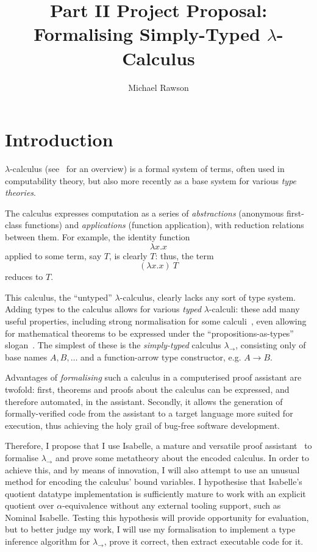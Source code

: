 \documentclass[12pt]{article}
\title{Part II Project Proposal: Formalising Simply-Typed \(\lambda\)-Calculus}
\author{Michael Rawson}
\begin{document}


\section*{Introduction}
\(\lambda\)-calculus (see~\parencite{lambda-overview} for an overview) is a formal system of terms, often used in computability theory, but also more recently as a base system for various \emph{type theories}.

The calculus expresses computation as a series of \emph{abstractions} (anonymous first-class functions) and \emph{applications} (function application), with reduction relations between them.
For example, the identity function
\[
\lambda x.x
\]
applied to some term, say \(T\), is clearly \(T\): thus, the term
\[
(\lambda x.x)\ T
\]
reduces to \(T\).

This calculus, the ``untyped'' \(\lambda\)-calculus, clearly lacks any sort of type system.
Adding types to the calculus allows for various \emph{typed} \(\lambda\)-calculi: these add many useful properties, including strong normalisation for some calculi~\parencite{strong-normalisation}, even allowing for mathematical theorems to be expressed under the ``propositions-as-types'' slogan~\parencite{curry-howard}.
The simplest of these is the \emph{simply-typed} calculus \(\lambda_\to\), consisting only of base names \(A, B, \ldots\) and a function-arrow type constructor, e.g. \(A \to B\).

Advantages of \emph{formalising} such a calculus in a computerised proof assistant are twofold: first, theorems and proofs about the calculus can be expressed, and therefore automated, in the assistant.
Secondly, it allows the generation of formally-verified code from the assistant to a target language more suited for execution, thus achieving the holy grail of bug-free software development.

Therefore, I propose that I use Isabelle, a mature and versatile proof assistant~\parencite{isabelle-overview} to formalise \(\lambda_\to\) and prove some metatheory about the encoded calculus.
In order to achieve this, and by means of innovation, I will also attempt to use an unusual method for encoding the calculus' bound variables.
I hypothesise that Isabelle's quotient datatype implementation is sufficiently mature to work with an explicit quotient over \(\alpha\)-equivalence without any external tooling support, such as Nominal Isabelle.
Testing this hypothesis will provide opportunity for evaluation, but to better judge my work, I will use my formalisation to implement a type inference algorithm for \(\lambda_\to\), prove it correct, then extract executable code for it.
\end{document}

